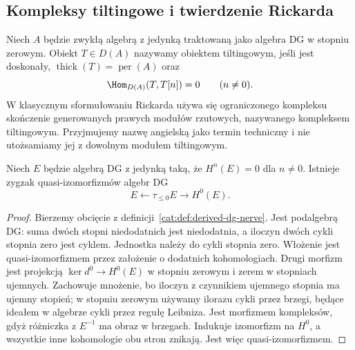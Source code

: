 \subsection{Kompleksy tiltingowe i twierdzenie Rickarda}

\begin{definicja}\label{cat:def:morita-tilting}
Niech $A$ będzie zwykłą algebrą z jedynką traktowaną jako algebra DG w stopniu zerowym. Obiekt $T\in D(A)$ nazywamy obiektem tiltingowym, jeśli jest doskonały, $\operatorname{thick}(T)=\operatorname{per}(A)$ oraz
\[
 \Hom_{D(A)}(T,T[n])=0\qquad(n\ne0).
\]
W klasycznym sformułowaniu Rickarda używa się ograniczonego kompleksu skończenie generowanych prawych modułów rzutowych, nazywanego kompleksem tiltingowym. Przyjmujemy nazwę angielską jako termin techniczny i nie utożsamiamy jej z dowolnym modułem tiltingowym.
\end{definicja}

\begin{lemat}\label{cat:lem:morita-end-formal}
Niech $E$ będzie algebrą DG z jedynką taką, że $H^n(E)=0$ dla $n\ne0$. Istnieje zygzak quasi-izomorfizmów algebr DG
\[
 E\longleftarrow\tau_{\leq0}E\longrightarrow H^0(E).
\]
\end{lemat}
\begin{proof}
Bierzemy obcięcie z definicji~\ref{cat:def:derived-dg-nerve}. Jest podalgebrą DG: suma dwóch stopni niedodatnich jest niedodatnia, a iloczyn dwóch cykli stopnia zero jest cyklem. Jednostka należy do cykli stopnia zero. Włożenie jest quasi-izomorfizmem przez założenie o dodatnich kohomologiach. Drugi morfizm jest projekcją $\ker d^0\to H^0(E)$ w stopniu zerowym i zerem w stopniach ujemnych. Zachowuje mnożenie, bo iloczyn z czynnikiem ujemnego stopnia ma ujemny stopień; w stopniu zerowym używamy ilorazu cykli przez brzegi, będące ideałem w algebrze cykli przez regułę Leibniza. Jest morfizmem kompleksów, gdyż różniczka z $E^{-1}$ ma obraz w brzegach. Indukuje izomorfizm na $H^0$, a wszystkie inne kohomologie obu stron znikają. Jest więc quasi-izomorfizmem.
\end{proof}

